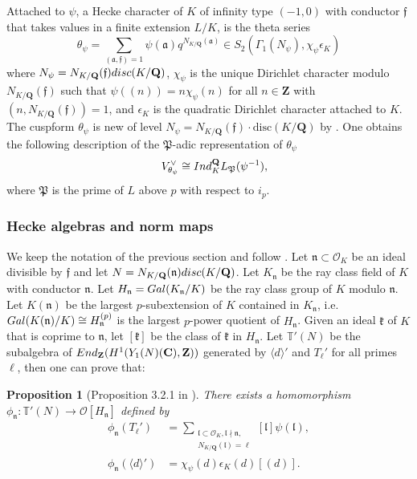 \documentclass[10pt,letterpaper]{amsart}
\theoremstyle{plain}
\theoremstyle{definition}
\theoremstyle{definition}
\theoremstyle{plain}
\newtheorem{prop}[thm]{Proposition}
\theoremstyle{plain}
\theoremstyle{plain}
\theoremstyle{remark}
\numberwithin{equation}{section}
\newcommand{\fkf}{\mathfrak{f}}
\newcommand{\fkl}{\mathfrak{l}}
\newcommand{\fkn}{\mathfrak{n}}
\newcommand{\bC}{\mathbf{C}}
\def\cO{\mathcal O}
\newcommand{\Q}{\mathbf{Q}}
\newcommand{\Z}{\mathbf{Z}}
\begin{document}
Attached to $\psi$, a Hecke character of $K$ of infinity type $(-1,0)$ with conductor $\fkf$ that takes values in a finite extension $L/K$, is the theta series 
\begin{equation*}
\theta_{\psi}=\sum_{(\mathfrak{a},\fkf)=1}\psi(\mathfrak{a})q^{N_{K/\Q}(\mathfrak{a})} \in S_2(\Gamma_1(N_\psi),\chi_\psi\epsilon_K)
\end{equation*}
where $N_\psi=N_{K/\Q}(\fkf){\rm disc}(K/\Q)$, $\chi_\psi$ is the unique Dirichlet character modulo $N_{K/\Q}(\fkf)$ such that 
$\psi((n))=n\chi_\psi(n)$ for all $n\in\Z$ with $(n,N_{K/\Q}(\fkf))=1$, and $\epsilon_K$ is the quadratic Dirichlet character attached to $K$. 
The cuspform $\theta_\psi$ is new of level $N_\psi=N_{K/\Q}(\mathfrak{f})\cdot \text{disc}(K/\Q)$ by \cite{Mi}. 
One obtains the following description of the $\mathfrak{P}$-adic representation of $\theta_\psi$
\[
\quad V_{\theta_{\psi}}^{\vee}\cong {\rm Ind}^{\Q}_KL_{\mathfrak{P}}(\psi^{-1}),
\]
where $\mathfrak{P}$ is the prime of $L$ above $p$ with respect to $i_p$.
\subsubsection{Hecke algebras and norm maps}\label{LLZrecall}

We keep the notation of the previous section and follow \cite[Sec.\,1.3.1]{CD}. Let $\fkn\subset\cO_K$ be an ideal divisible by $\fkf$ and let $N=N_{K/\Q}(\fkn){\rm disc}(K/\Q)$. Let $K_{\fkn}$ be the ray class field of $K$ with conductor $\fkn$. Let $H_\fkn={\rm Gal}(K_{\fkn}/K)$ be the ray class group of $K$ modulo $\fkn$. Let $K(\fkn)$ be the largest $p$-subextension of $K$ contained in $K_{\fkn}$, i.e. ${\rm Gal}(K(\fkn)/K)\cong H_{\fkn}^{(p)}$ is the largest $p$-power quotient of $H_{\fkn}$. Given an ideal $\mathfrak{k}$ of $K$ that is coprime to $\fkn$, let $[\mathfrak{k}]$ be the class of $\mathfrak{k}$ in $H_{\fkn}$. Let $\mathbb{T}'(N)$ be the subalgebra of ${\rm End}_{\Z}(H^1(Y_1(N)(\bC),\Z))$ generated by $\langle d\rangle'$ and $T_\ell'$ for all primes $\ell$, then one can prove that:

\begin{prop}[Proposition 3.2.1 in \cite{LLZ-K}]\label{phi_n}
 There exists a homomorphism $\phi_{\fkn}: \mathbb{T}'(N)\rightarrow \mathcal{O}[H_{\fkn}]$ 
defined by 
    \begin{align*}
        \phi_{\fkn}(T_\ell')&=\sum_{\substack{\mathfrak{l}\subset\cO_K,\fkl\nmid\mathfrak{n},\\N_{K/\Q}(\fkl)=\ell}}[\fkl]\psi(\fkl),\\
        \phi_{\fkn}(\langle d\rangle ')&=\chi_\psi(d)\epsilon_{K}(d)[(d)].
    \end{align*}
\end{prop}
\end{document}
